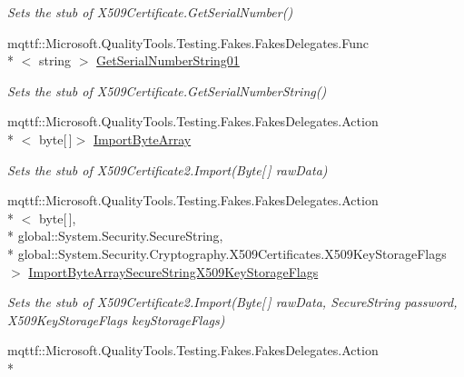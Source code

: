 \begin{DoxyCompactItemize}
\begin{DoxyCompactList}\small\item\em Sets the stub of X509\-Certificate.\-Get\-Serial\-Number()\end{DoxyCompactList}\item 
mqttf\-::\-Microsoft.\-Quality\-Tools.\-Testing.\-Fakes.\-Fakes\-Delegates.\-Func\\*
$<$ string $>$ \hyperlink{class_system_1_1_security_1_1_cryptography_1_1_x509_certificates_1_1_fakes_1_1_stub_x509_certificate2_a8bac29a1fc074d77a200eaaa0f6e48ef}{Get\-Serial\-Number\-String01}
\begin{DoxyCompactList}\small\item\em Sets the stub of X509\-Certificate.\-Get\-Serial\-Number\-String()\end{DoxyCompactList}\item 
mqttf\-::\-Microsoft.\-Quality\-Tools.\-Testing.\-Fakes.\-Fakes\-Delegates.\-Action\\*
$<$ byte\mbox{[}$\,$\mbox{]}$>$ \hyperlink{class_system_1_1_security_1_1_cryptography_1_1_x509_certificates_1_1_fakes_1_1_stub_x509_certificate2_aa668baec3855ff4e00ba9b6307f3553d}{Import\-Byte\-Array}
\begin{DoxyCompactList}\small\item\em Sets the stub of X509\-Certificate2.\-Import(\-Byte\mbox{[}$\,$\mbox{]} raw\-Data)\end{DoxyCompactList}\item 
mqttf\-::\-Microsoft.\-Quality\-Tools.\-Testing.\-Fakes.\-Fakes\-Delegates.\-Action\\*
$<$ byte\mbox{[}$\,$\mbox{]}, \\*
global\-::\-System.\-Security.\-Secure\-String, \\*
global\-::\-System.\-Security.\-Cryptography.\-X509\-Certificates.\-X509\-Key\-Storage\-Flags $>$ \hyperlink{class_system_1_1_security_1_1_cryptography_1_1_x509_certificates_1_1_fakes_1_1_stub_x509_certificate2_a813e8a048414222a2ba927a0458cab09}{Import\-Byte\-Array\-Secure\-String\-X509\-Key\-Storage\-Flags}
\begin{DoxyCompactList}\small\item\em Sets the stub of X509\-Certificate2.\-Import(\-Byte\mbox{[}$\,$\mbox{]} raw\-Data, Secure\-String password, X509\-Key\-Storage\-Flags key\-Storage\-Flags)\end{DoxyCompactList}\item 
mqttf\-::\-Microsoft.\-Quality\-Tools.\-Testing.\-Fakes.\-Fakes\-Delegates.\-Action\\*

\end{DoxyCompactItemize}
